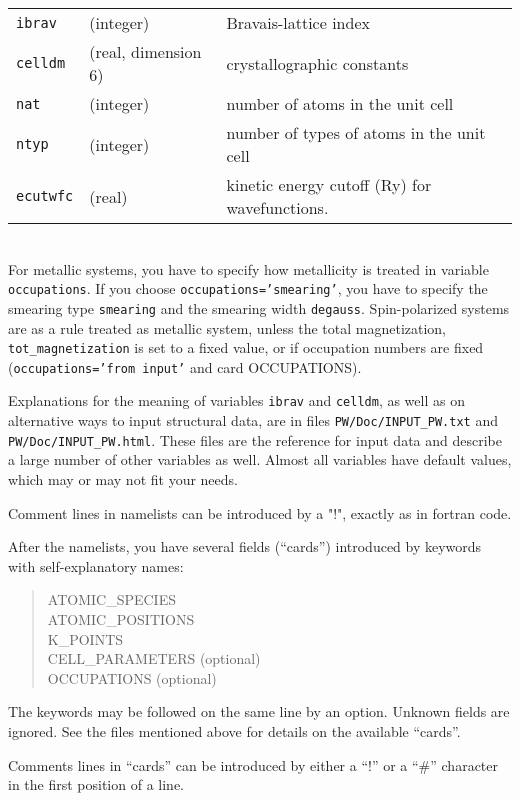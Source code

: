 \documentclass[12pt,a4paper]{article}
\begin{document}
\begin{tabular}{lll}
      \texttt{ibrav} & (integer)& Bravais-lattice index\\
      \texttt{celldm} &(real, dimension 6)& crystallographic constants\\
      \texttt{nat} &(integer)& number of atoms in the unit cell\\
      \texttt{ntyp} &(integer)& number of types of atoms in the unit cell\\
      \texttt{ecutwfc} &(real)& kinetic energy cutoff (Ry) for wavefunctions.
\end{tabular}    \\
For metallic systems, you have to specify how metallicity is treated
in
variable \texttt{occupations}. If you choose \texttt{occupations='smearing'},
you have
to specify the smearing type \texttt{smearing} and the smearing width 
\texttt{degauss}. Spin-polarized systems are as a rule treated as metallic 
system, unless the total magnetization, \texttt{tot\_magnetization}
is set to a fixed value, or if occupation numbers are fixed
(\texttt{occupations='from input'} and card OCCUPATIONS).
    
Explanations for the meaning of variables \texttt{ibrav} and \texttt{celldm},
as well as on alternative ways to input structural data,
are in files \texttt{PW/Doc/INPUT\_PW.txt} and \texttt{PW/Doc/INPUT\_PW.html}. 
These files are the reference for input data and describe a large number
of other variables as well. Almost all variables have default 
values, which may or may not fit your needs.

Comment lines in namelists can be introduced by a "!", exactly as in fortran 
code.
    
After the namelists, you have several fields (``cards'')
introduced by keywords with self-explanatory names:
\begin{quote}
       ATOMIC\_SPECIES\\
       ATOMIC\_POSITIONS\\
       K\_POINTS\\
       CELL\_PARAMETERS (optional)\\
       OCCUPATIONS (optional)\\
\end{quote}
The keywords may be followed on the same line by an option. Unknown
fields are ignored. 
See the files mentioned above for details on the available ``cards''.

Comments lines in ``cards'' can be introduced by either a ``!'' or a ``\#''
character in the first position of a line.
 
\end{document}

